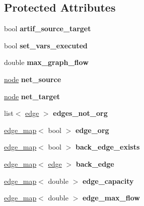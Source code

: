 \subsection*{Protected Attributes}
\begin{DoxyCompactItemize}
\item 
\mbox{\label{classmaxflow__ff_a1ec31e7053722875a2e90659f79396a3}} 
bool {\bfseries artif\+\_\+source\+\_\+target}
\item 
\mbox{\label{classmaxflow__ff_a2551a00303d9b81ccc6b3d1f575d7956}} 
bool {\bfseries set\+\_\+vars\+\_\+executed}
\item 
\mbox{\label{classmaxflow__ff_a7a2f530f9c95b6f37f4c349427a0f9bb}} 
double {\bfseries max\+\_\+graph\+\_\+flow}
\item 
\mbox{\label{classmaxflow__ff_a2e4cc02ce8c9d929f2896525c686d6c1}} 
\mbox{\hyperlink{classnode}{node}} {\bfseries net\+\_\+source}
\item 
\mbox{\label{classmaxflow__ff_a94d5db73364cf5824ec3d3d530b57319}} 
\mbox{\hyperlink{classnode}{node}} {\bfseries net\+\_\+target}
\item 
\mbox{\label{classmaxflow__ff_a5798d469fb86dc7635a36dcf327a1906}} 
list$<$ \mbox{\hyperlink{classedge}{edge}} $>$ {\bfseries edges\+\_\+not\+\_\+org}
\item 
\mbox{\label{classmaxflow__ff_aa9fd46b8da1a67678b132a17e7a41c91}} 
\mbox{\hyperlink{classedge__map}{edge\+\_\+map}}$<$ bool $>$ {\bfseries edge\+\_\+org}
\item 
\mbox{\label{classmaxflow__ff_a686006593b17dfd3ad9a5e02b1ad9e92}} 
\mbox{\hyperlink{classedge__map}{edge\+\_\+map}}$<$ bool $>$ {\bfseries back\+\_\+edge\+\_\+exists}
\item 
\mbox{\label{classmaxflow__ff_abceef8f9ee5acf7a992301de6d0c80de}} 
\mbox{\hyperlink{classedge__map}{edge\+\_\+map}}$<$ \mbox{\hyperlink{classedge}{edge}} $>$ {\bfseries back\+\_\+edge}
\item 
\mbox{\label{classmaxflow__ff_a5b38943e093c77a57eb70f1a4190b8a6}} 
\mbox{\hyperlink{classedge__map}{edge\+\_\+map}}$<$ double $>$ {\bfseries edge\+\_\+capacity}
\item 
\mbox{\label{classmaxflow__ff_a669f36f1fae2dd0f6cfc0172e3ae0e8f}} 
\mbox{\hyperlink{classedge__map}{edge\+\_\+map}}$<$ double $>$ {\bfseries edge\+\_\+max\+\_\+flow}
\end{DoxyCompactItemize}
